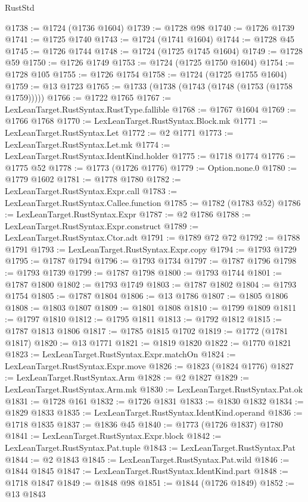\begin{lexlean}{RustStd}
\begin{coremodule}
@1738 := @1724 (@1736 @1604)
@1739 := @1728 @98
@1740 := @1726 @1739
@1741 := @1725 @1740
@1743 := @1724 (@1741 @1604)
@1744 := @1728 @45
@1745 := @1726 @1744
@1748 := @1724 (@1725 @1745 @1604)
@1749 := @1728 @59
@1750 := @1726 @1749
@1753 := @1724 (@1725 @1750 @1604)
@1754 := @1728 @105
@1755 := @1726 @1754
@1758 := @1724 (@1725 @1755 @1604)
@1759 := @13 @1723
@1765 := @1733 (@1738 (@1743 (@1748 (@1753 (@1758 @1759)))))
@1766 := @1722 @1765
@1767 := LexLeanTarget.RustSyntax.RustType.fallible
@1768 := @1767 @1604
@1769 := @1766 @1768
@1770 := LexLeanTarget.RustSyntax.Block.mk
@1771 := LexLeanTarget.RustSyntax.Let
@1772 := @2 @1771
@1773 := LexLeanTarget.RustSyntax.Let.mk
@1774 := LexLeanTarget.RustSyntax.IdentKind.holder
@1775 := @1718 @1774
@1776 := @1775 @52
@1778 := @1773 (@1726 @1776)
@1779 := Option.none.{0}
@1780 := @1779 @1602
@1781 := @1778 @1780
@1782 := LexLeanTarget.RustSyntax.Expr.call
@1783 := LexLeanTarget.RustSyntax.Callee.function
@1785 := @1782 (@1783 @52)
@1786 := LexLeanTarget.RustSyntax.Expr
@1787 := @2 @1786
@1788 := LexLeanTarget.RustSyntax.Expr.construct
@1789 := LexLeanTarget.RustSyntax.Ctor.adt
@1791 := @1789 @72 @72
@1792 := @1788 @1791
@1793 := LexLeanTarget.RustSyntax.Expr.copy
@1794 := @1793 @1729
@1795 := @1787 @1794
@1796 := @1793 @1734
@1797 := @1787 @1796
@1798 := @1793 @1739
@1799 := @1787 @1798
@1800 := @1793 @1744
@1801 := @1787 @1800
@1802 := @1793 @1749
@1803 := @1787 @1802
@1804 := @1793 @1754
@1805 := @1787 @1804
@1806 := @13 @1786
@1807 := @1805 @1806
@1808 := @1803 @1807
@1809 := @1801 @1808
@1810 := @1799 @1809
@1811 := @1797 @1810
@1812 := @1795 @1811
@1813 := @1792 @1812
@1815 := @1787 @1813 @1806
@1817 := @1785 @1815 @1702
@1819 := @1772 (@1781 @1817)
@1820 := @13 @1771
@1821 := @1819 @1820
@1822 := @1770 @1821
@1823 := LexLeanTarget.RustSyntax.Expr.matchOn
@1824 := LexLeanTarget.RustSyntax.Expr.move
@1826 := @1823 (@1824 @1776)
@1827 := LexLeanTarget.RustSyntax.Arm
@1828 := @2 @1827
@1829 := LexLeanTarget.RustSyntax.Arm.mk
@1830 := LexLeanTarget.RustSyntax.Pat.ok
@1831 := @1728 @161
@1832 := @1726 @1831
@1833 := @1830 @1832
@1834 := @1829 @1833
@1835 := LexLeanTarget.RustSyntax.IdentKind.operand
@1836 := @1718 @1835
@1837 := @1836 @45
@1840 := @1773 (@1726 @1837) @1780
@1841 := LexLeanTarget.RustSyntax.Expr.block
@1842 := LexLeanTarget.RustSyntax.Pat.tuple
@1843 := LexLeanTarget.RustSyntax.Pat
@1844 := @2 @1843
@1845 := LexLeanTarget.RustSyntax.Pat.wild
@1846 := @1844 @1845
@1847 := LexLeanTarget.RustSyntax.IdentKind.part
@1848 := @1718 @1847
@1849 := @1848 @98
@1851 := @1844 (@1726 @1849)
@1852 := @13 @1843

\end{coremodule}
\end{lexlean}
